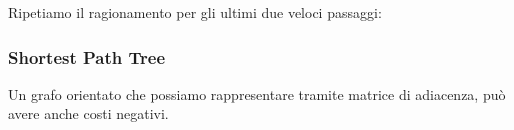 \documentclass{article}
\begin{document}
Ripetiamo il ragionamento per gli ultimi due veloci passaggi:

\begin{center}
\end{center}

\subsubsection{Shortest Path Tree}
Un grafo orientato che possiamo rappresentare tramite matrice di adiacenza, può avere anche costi negativi.\\
\end{document}
